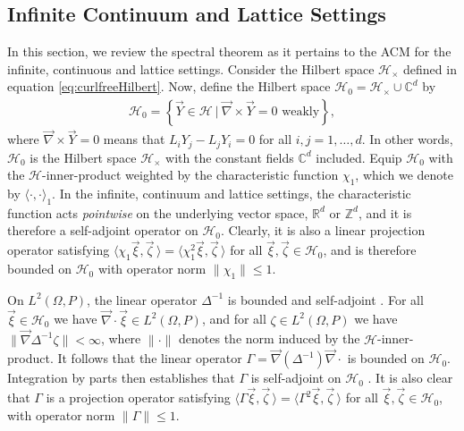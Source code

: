 \documentclass{cmslatex}
\begin{document}
\subsection{Infinite Continuum and Lattice Settings}
\label{sec:The_Spectral_Theorem_Continuum} 
%
In this section, we review the spectral theorem as it pertains to the
ACM for the infinite, continuous and lattice settings. Consider the
Hilbert space $\mathscr{H}_\times$ defined in equation
\eqref{eq:curlfreeHilbert}. Now, define the Hilbert space
$\mathscr{H}_0=\mathscr{H}_\times\cup\mathbb{C}^d$ by 
%
\begin{align}
  \mathscr{H}_0=
  \left\{\vec{Y}\in \mathscr{H} \ | \ \vec{\nabla} \times\vec{Y}=0 \text{ weakly}
  \right\},
\end{align}
%
where $\vec{\nabla} \times\vec{Y}=0$ means that $L_iY_j-L_jY_i=0$ for all $i,j=1,\ldots,d$.
In other words, $\mathscr{H}_0$ is the Hilbert space $\mathscr{H}_\times$
with the constant fields $\mathbb{C}^d$ included. Equip $\mathscr{H}_0$ with the
$\mathscr{H}$-inner-product weighted by the characteristic function 
$\chi_1$, which we denote by $\langle\cdot,\cdot\rangle_1$. In the infinite, continuum and 
lattice settings, the characteristic function acts \emph{pointwise} on
the underlying vector space, $\mathbb{R}^d$ or $\mathbb{Z}^d$, and it is
therefore a self-adjoint operator on $\mathscr{H}_0$. Clearly, it is
also a linear projection operator satisfying
$\langle\chi_1\vec{\xi},\vec{\zeta}\,\rangle=\langle\chi_1^2\vec{\xi},\vec{\zeta}\,\rangle$ for all
$\vec{\xi},\vec{\zeta}\in\mathscr{H}_0$, and is therefore bounded on
$\mathscr{H}_0$ with operator norm $\|\chi_1\|\leq1$.

On $L^2(\Omega,P)$, the linear operator $\Delta^{-1}$ is bounded and self-adjoint 
\cite{Stakgold:BVP:2000}. For all $\vec{\xi}\in\mathscr{H}_0$ we
have $\vec{\nabla}\cdot\vec{\xi}\in L^2(\Omega,P)$, and for all $\zeta\in L^2(\Omega,P)$ we have
$\|\vec{\nabla}\Delta^{-1}\zeta\|<\infty$, where $\|\cdot\|$ denotes the norm induced by the
$\mathscr{H}$-inner-product. It follows that  the linear operator
$\Gamma=\vec{\nabla}(\Delta^{-1})\vec{\nabla}\cdot$ is bounded on
$\mathscr{H}_0$. Integration by parts then
establishes that $\Gamma$ is self-adjoint on $\mathscr{H}_0$
\cite{Golden:CMP-473}. It is also clear that $\Gamma$ is a 
projection operator satisfying
$\langle\Gamma\vec{\xi},\vec{\zeta}\,\rangle=\langle\Gamma^2\vec{\xi},\vec{\zeta}\,\rangle$ for all
$\vec{\xi},\vec{\zeta}\in\mathscr{H}_0$, with operator norm $\|\Gamma\|\leq1$.  
\end{document}
